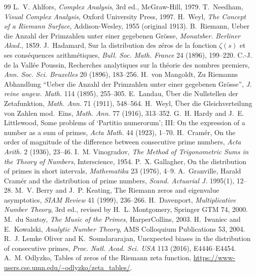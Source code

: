 \documentclass[11pt,a4paper]{article}
\theoremstyle{remark}
\theoremstyle{definition}
\begin{document}
\begin{thebibliography}{99}\small
{} L.~V. Ahlfors, \emph{Complex Analysis}, 3rd ed., McGraw-Hill, 1979.
 T.~Needham, \emph{Visual Complex Analysis}, Oxford University Press, 1997.
 H.~Weyl, \emph{The Concept of a Riemann Surface}, Addison-Wesley, 1955 (original 1913).
 B.~Riemann, Ueber die Anzahl der Primzahlen unter einer gegebenen Gr\"osse, \emph{Monatsber. Berliner Akad.}, 1859.
 J.~Hadamard, Sur la distribution des z\'eros de la fonction $\zeta(s)$ et ses cons\'equences arithm\'etiques, \emph{Bull. Soc. Math. France} 24 (1896), 199--220.
 C.-J. de la Vall\'ee Poussin, Recherches analytiques sur la th\'eorie des nombres premiers, \emph{Ann. Soc. Sci. Bruxelles} 20 (1896), 183--256.
 H.~von Mangoldt, Zu Riemanns Abhandlung ``Ueber die Anzahl der Primzahlen unter einer gegebenen Gr\"osse'', \emph{J. reine angew. Math.} 114 (1895), 255--305.
 E.~Landau, \"Uber die Nullstellen der Zetafunktion, \emph{Math. Ann.} 71 (1911), 548--564.
 H.~Weyl, \"Uber die Gleichverteilung von Zahlen mod.\ Eins, \emph{Math. Ann.} 77 (1916), 313--352.
 G.~H. Hardy and J.~E. Littlewood, Some problems of `Partitio numerorum'; III: On the expression of a number as a sum of primes, \emph{Acta Math.} 44 (1923), 1--70.
 H.~Cram\'er, On the order of magnitude of the difference between consecutive prime numbers, \emph{Acta Arith.} 2 (1936), 23--46.
 I.~M. Vinogradov, \emph{The Method of Trigonometric Sums in the Theory of Numbers}, Interscience, 1954.
 P.~X. Gallagher, On the distribution of primes in short intervals, \emph{Mathematika} 23 (1976), 4--9.
 A.~Granville, Harald Cram\'er and the distribution of prime numbers, \emph{Scand. Actuarial J.} 1995(1), 12--28.
 M.~V. Berry and J.~P. Keating, The Riemann zeros and eigenvalue asymptotics, \emph{SIAM Review} 41 (1999), 236--266.
 H.~Davenport, \emph{Multiplicative Number Theory}, 3rd ed., revised by H.~L. Montgomery, Springer GTM 74, 2000.
 M.~du Sautoy, \emph{The Music of the Primes}, HarperCollins, 2003.
 H.~Iwaniec and E.~Kowalski, \emph{Analytic Number Theory}, AMS Colloquium Publications 53, 2004.
 R.~J. Lemke Oliver and K.~Soundararajan, Unexpected biases in the distribution of consecutive primes, \emph{Proc. Natl. Acad. Sci. USA} 113 (2016), E4446--E4454.
 A.~M. Odlyzko, Tables of zeros of the Riemann zeta function, \url{https://www-users.cse.umn.edu/~odlyzko/zeta_tables/}.
\end{thebibliography}
\end{document}
